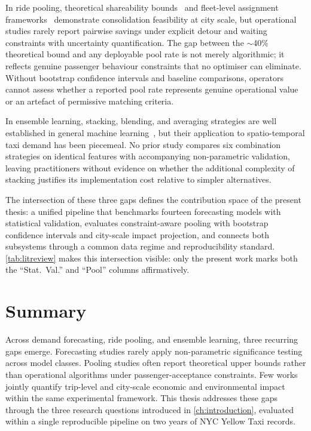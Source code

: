 In ride pooling, theoretical shareability bounds~\parencite{santi2014quantifying} and fleet-level assignment frameworks~\parencite{alonso2017demand} demonstrate consolidation feasibility at city scale, but operational studies rarely report pairwise savings under explicit detour and waiting constraints with uncertainty quantification. The gap between the $\sim$40\% theoretical bound and any deployable pool rate is not merely algorithmic; it reflects genuine passenger behaviour constraints that no optimiser can eliminate. Without bootstrap confidence intervals and baseline comparisons, operators cannot assess whether a reported pool rate represents genuine operational value or an artefact of permissive matching criteria.

In ensemble learning, stacking, blending, and averaging strategies are well established in general machine learning~\parencite{wolpert1992stacking,breiman2001rf,chen2016xgboost}, but their application to spatio-temporal taxi demand has been piecemeal. No prior study compares six combination strategies on identical features with accompanying non-parametric validation, leaving practitioners without evidence on whether the additional complexity of stacking justifies its implementation cost relative to simpler alternatives.

The intersection of these three gaps defines the contribution space of the present thesis: a unified pipeline that benchmarks fourteen forecasting models with statistical validation, evaluates constraint-aware pooling with bootstrap confidence intervals and city-scale impact projection, and connects both subsystems through a common data regime and reproducibility standard. \autoref{tab:litreview} makes this intersection visible: only the present work marks both the ``Stat.\ Val.'' and ``Pool'' columns affirmatively.

\section{Summary}

Across demand forecasting, ride pooling, and ensemble learning, three recurring gaps emerge. Forecasting studies rarely apply non-parametric significance testing across model classes. Pooling studies often report theoretical upper bounds rather than operational algorithms under passenger-acceptance constraints. Few works jointly quantify trip-level and city-scale economic and environmental impact within the same experimental framework. This thesis addresses these gaps through the three research questions introduced in \autoref{ch:introduction}, evaluated within a single reproducible pipeline on two years of NYC Yellow Taxi records.
